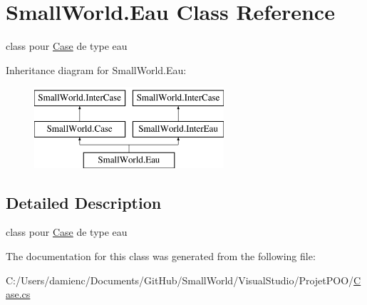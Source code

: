 \hypertarget{class_small_world_1_1_eau}{\section{Small\-World.\-Eau Class Reference}
\label{class_small_world_1_1_eau}
}


class pour \hyperlink{class_small_world_1_1_case}{Case} de type eau  


Inheritance diagram for Small\-World.\-Eau\-:\begin{figure}[H]
\begin{center}
\leavevmode
\includegraphics[height=3.000000cm]{class_small_world_1_1_eau}
\end{center}
\end{figure}


\subsection{Detailed Description}
class pour \hyperlink{class_small_world_1_1_case}{Case} de type eau 

The documentation for this class was generated from the following file\-:\begin{DoxyCompactItemize}
\item 
C\-:/\-Users/damienc/\-Documents/\-Git\-Hub/\-Small\-World/\-Visual\-Studio/\-Projet\-P\-O\-O/\hyperlink{_case_8cs}{Case.\-cs}\end{DoxyCompactItemize}

